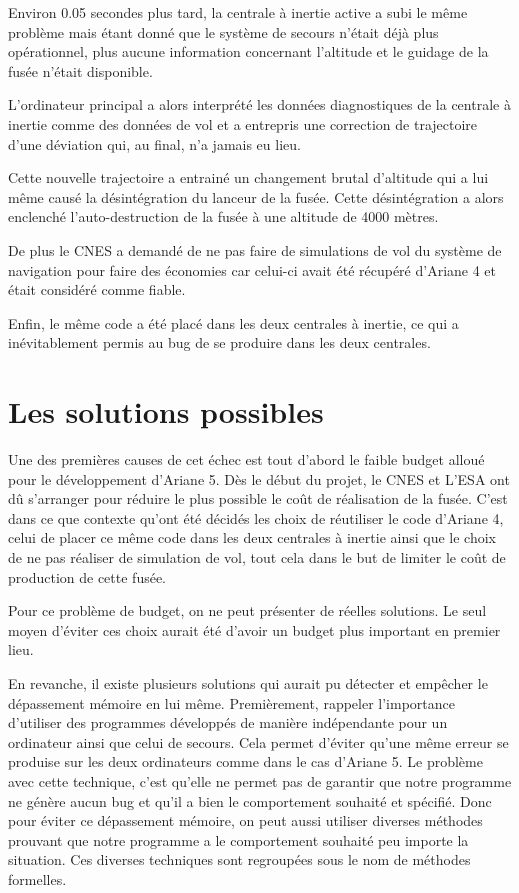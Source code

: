 \documentclass[12pt]{report}
\begin{document}
Environ 0.05 secondes plus tard, la centrale à inertie active a subi le même problème mais étant donné que le système de secours n'était déjà plus opérationnel, plus aucune information concernant l'altitude et le guidage de la fusée n'était disponible.   

L'ordinateur principal a alors interprété les données diagnostiques de la centrale à inertie comme des données de vol et a entrepris une correction de trajectoire d'une déviation qui, au final, n'a jamais eu lieu.
  
Cette nouvelle trajectoire a entrainé un changement brutal d'altitude qui a lui même causé la désintégration du lanceur de la fusée. Cette désintégration a alors enclenché l'auto-destruction de la fusée à une altitude de 4000 mètres.

De plus le \gls{CNES} a demandé de ne pas faire de simulations de vol du système de navigation pour faire des économies car celui-ci avait été récupéré d'Ariane 4 et était considéré comme fiable.

Enfin, le même code a été placé dans les deux centrales à inertie, ce qui a inévitablement permis au bug de se produire dans les deux centrales. 

\section{Les solutions possibles}
Une des premières causes de cet échec est tout d'abord le faible budget alloué pour le développement d'Ariane 5.
Dès le début du projet, le CNES et L'\gls{ESA} ont dû s'arranger pour réduire le plus possible le coût de réalisation de la fusée. C'est dans ce que contexte qu'ont été décidés les choix de réutiliser le code d'Ariane 4, celui de placer ce même code dans les deux centrales à inertie ainsi que le choix de ne pas réaliser de simulation de vol, tout cela dans le but de limiter le coût de production de cette fusée.

Pour ce problème de budget, on ne peut présenter de réelles solutions. Le seul moyen d'éviter ces choix aurait été d'avoir un budget plus important en premier lieu.

En revanche, il existe plusieurs solutions qui aurait pu détecter et empêcher le dépassement mémoire en lui même. Premièrement, rappeler l'importance d'utiliser des programmes développés de manière indépendante pour un ordinateur ainsi que celui de secours. Cela permet d'éviter qu'une même erreur se produise sur les deux ordinateurs comme dans le cas d'Ariane 5. Le problème avec cette technique, c'est qu'elle ne permet pas de garantir que notre programme ne génère aucun bug et qu'il a bien le comportement souhaité et spécifié. Donc pour éviter ce dépassement mémoire, on peut aussi utiliser diverses méthodes prouvant que notre programme a le comportement souhaité peu importe la situation. Ces diverses techniques sont regroupées sous le nom de méthodes formelles. 
\end{document}
